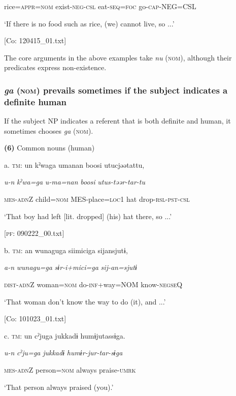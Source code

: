       rice=\textsc{appr}=\textsc{nom}  exist-\textsc{neg}-\textsc{csl}  eat-\textsc{seq}=\textsc{foc}  go-\textsc{cap}-NEG=CSL

      ‘If there is no food such as rice, (we) cannot live, so ...’

      [Co: 120415\_01.txt]

The core arguments in the above examples take \textit{nu} (\textsc{nom}), although their predicates express non-existence.

\subsubsection{\textit{ga} (\textsc{nom}) prevails sometimes if the subject indicates a definite human}

If the subject NP indicates a referent that is both definite and human, it sometimes chooses \textit{ga} (\textsc{nom}).

\textbf{(6)}  Common nouns (human)

  a.  \textsc{tm}:  un  kˀwaga  umanan  {\textbar}boosi{\textbar}  utucjəətattu,

      \textit{u-n}  \textit{kˀwa=ga}  \textit{u-ma=nan}  \textit{boosi}  \textit{utus-təər-tar-tu}

      \textsc{mes}-\textsc{adn}Z  child=\textsc{nom}  MES-place=\textsc{loc}1  hat  drop-\textsc{rsl}-\textsc{pst}-\textsc{csl}

      ‘That boy had left [lit. dropped] (his) hat there, so ...’

      [\textsc{pf}: 090222\_00.txt]

  b.  \textsc{tm}:  an  wunaguga  siimiciga  sijansjutɨ,

      \textit{a-n}  \textit{wunagu=ga}  \textit{sɨr-i+mici=ga}  \textit{sij-an=sjutɨ}

      \textsc{dist}-\textsc{adn}Z  woman=\textsc{nom}  do-\textsc{inf}+way=NOM  know-\textsc{negseQ}

      ‘That woman don’t know the way to do (it), and ...’

      [Co: 101023\_01.txt]

  c.  \textsc{tm}:  un  cˀjuga  jukkadɨ  humɨjutassɨga.

      \textit{u-n}  \textit{cˀju=ga}  \textit{jukkadɨ}  \textit{humɨr-jur-tar-sɨga}

      \textsc{mes}-\textsc{adn}Z  person=\textsc{nom}  always  praise-\textsc{umrk}

      ‘That person always praised (you).’

